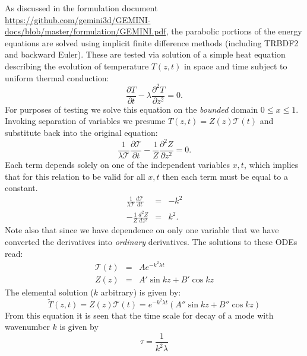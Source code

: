 \documentclass[11pt,letterpaper]{article}
\begin{document}
As discussed in the formulation document \url{https://github.com/gemini3d/GEMINI-docs/blob/master/formulation/GEMINI.pdf}, the parabolic portions of the energy equations are solved using implicit finite difference methods (including TRBDF2 and backward Euler).  These are tested via solution of a simple heat equation describing the evolution of temperature $T(z,t)$ in space and time subject to uniform thermal conduction:
\begin{equation}
\frac{\partial T}{\partial t} - \lambda \frac{\partial^2 T}{\partial z^2} = 0.
\end{equation}
For purposes of testing we solve this equation on the \emph{bounded} domain $0 \le x \le 1$.  Invoking separation of variables we presume $T(z,t)=Z(z) \mathcal{T}(t)$ and substitute back into the original equation:  
\begin{equation}
\frac{1}{\lambda \mathcal{T}} \frac{\partial \mathcal{T}}{\partial t} - \frac{1}{Z} \frac{\partial^2 Z}{\partial z^2} = 0.
\end{equation}
Each term depends solely on one of the independent variables $x,t$, which implies that for this relation to be valid for all $x,t$ then each term must be equal to a constant.  
\begin{eqnarray}
\frac{1}{\lambda \mathcal{T}} \frac{d \mathcal{T}}{d t} &=& -k^2 \\
- \frac{1}{Z} \frac{d^2 Z}{d z^2} &=& k^2.
\end{eqnarray}
Note also that since we have dependence on only one variable that we have converted the derivatives into \emph{ordinary} derivatives.  The solutions to these ODEs read:
\begin{eqnarray}
\mathcal{T}(t) &=& A e^{-k^2 \lambda t} \\
Z(z) &=& A' \sin kz + B' \cos kz
\end{eqnarray}
The elemental solution ($k$ arbitrary) is given by: 
\begin{equation}
\tilde{T}(z,t)=Z(z) \mathcal{T}(t) = e^{-k^2 \lambda t} \left( A'' \sin kz + B'' \cos kz \right)
\end{equation}
From this equation it is seen that the time scale for decay of a mode with wavenumber $k$ is given by 
\begin{equation}
\tau = \frac{1}{k^2 \lambda}
\end{equation}
\end{document}
